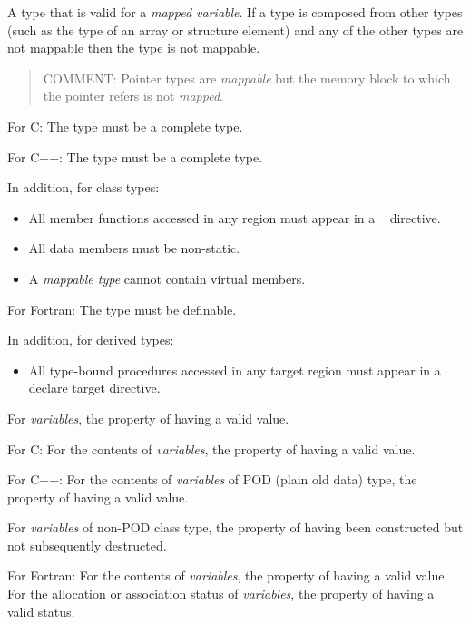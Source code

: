 \glossarydefstart
A type that is valid for a \emph{mapped variable}. If a type is composed from other types 
(such as the type of an array or structure element) and any of the other types are 
not mappable then the type is not mappable.

\begin{quote}
COMMENT: Pointer types are \emph{mappable} but the memory block to which the pointer refers is not \emph{mapped}.
\end{quote}

For C: 
\nopagebreak
The type must be a complete type.

For C++: 
\nopagebreak
The type must be a complete type.

In addition, for class types:
\begin{itemize}
\item All member functions accessed in any  region must appear in a 
~ directive.

\item All data members must be non-static.

\item A \emph{mappable type} cannot contain virtual members. 
\end{itemize}

For Fortran: 
\nopagebreak
The type must be definable.

In addition, for derived types:

\begin{itemize}
\item All type-bound procedures accessed in any target region must appear in a declare target directive.
\end{itemize}
\glossarydefend

\glossarydefstart
For \emph{variables}, the property of having a valid value.

For C:
\nopagebreak
For the contents of \emph{variables}, the property of having a valid value.

For C++: 
\nopagebreak
For the contents of \emph{variables} of POD (plain old data) type, the property of having 
a valid value.

For \emph{variables} of non-POD class type, the property of having been constructed but 
not subsequently destructed.

For Fortran: 
\nopagebreak
For the contents of \emph{variables}, the property of having a valid value. For the 
allocation or association status of \emph{variables}, the property of having a valid status.

